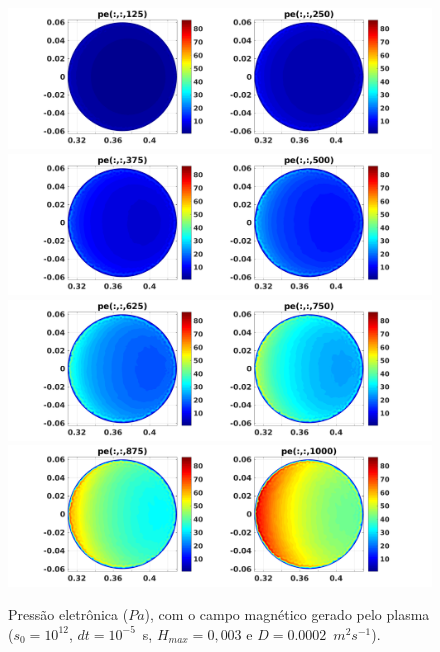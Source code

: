 \documentclass[12pt,oneside,a4paper]{abntex2}
\begin{document}
\begin{figure}[H]
\centering
\includegraphics[scale=0.5]{../SImulacao_breakdown/PDE/petod1B7.png}  
\includegraphics[scale=0.5]{../SImulacao_breakdown/PDE/petod2B7.png} 
\includegraphics[scale=0.5]{../SImulacao_breakdown/PDE/petod3B7.png} 
\includegraphics[scale=0.5]{../SImulacao_breakdown/PDE/petod4B7.png} 
\caption{Pressão eletrônica ($Pa$), com o campo magnético gerado pelo plasma ($s_0=10^{12}$, $dt=10^{-5}$\ s, $H_{max} = 0,003$ e $D=0.0002$\ $m^2s^{-1}$).}
\label{campplasmasi3l3}
\end{figure}
\end{document}
